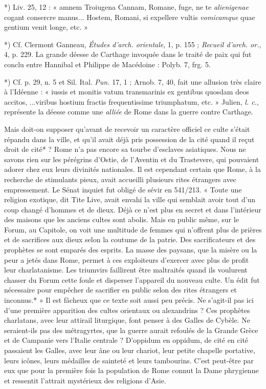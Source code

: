 \documentclass[a4paper, 11pt, oneside, polutonikogreek, french]{article}
\begin{document}
*) Liv. 25, 12 : « amnem Troiugena Cannam, Romane, fuge, ne te \emph{alienigenae} cogant consercre manus... Hostem, Romani, si expellere vultis \emph{vomicamque} quae gentium venit longe, etc. »

*) Cf. Clermont Ganneau, \emph{Études d'arch. orientale}, 1, p. 155 ; \emph{Recueil d'arch. or.}, 4, p. 229. La grande déesse de Carthage invoquée dans le traité de paix qui fut conclu entre Hannibal et Philippe de Macédoine : Polyb. 7, frg. 5.

*) Cf. p. 29, n. 5 et Sil. Ital. \emph{Pun.} 17, 1 ; Arnob. 7, 40, fait une allusion très claire à l'Idéenne : « iussis et monitis vatum transmarinis ex gentibus quosdam deos accitos, ...viribus hostium fractis frequentissime triumphatum, etc. » Julien, \emph{l. c.}, représente la déesse comme une \emph{alliée} de Rome dans la guerre contre Carthage.

Mais doit-on supposer qu'avant de recevoir un caractère officiel ce culte s'était répandu dans la ville, et qu'il avait déjà pris possession de la cité quand il reçut droit de cité* ? Rome n'a pas encore sa tourbe d'esclaves asiatiques. Nous ne savons rien sur les pérégrins d'Ostie, de l'Aventin et du Trastevere, qui pouvaient adorer chez eux leurs divinités nationales. Il est cependant certain que Rome, à la recherche de stimulants pieux, avait accueilli plusieurs rites étrangers avec empressement. Le Sénat inquiet fut obligé de sévir en 541/213. « Toute une religion exotique, dit Tite Live, avait envahi la ville qui semblait avoir tout d'un coup changé d'hommes et de dieux. Déjà ce n'est plus en secret et dans l'intérieur des maisons que les anciens cultes sont abolis. Mais en public même, sur le Forum, au Capitole, on voit une multitude de femmes qui n'offrent plus de prières et de sacrifices aux dieux selon la coutume de la patrie. Des sacrificateurs et des prophètes se sont emparés des esprits. La masse des paysans, que la misère ou la peur a jetés dans Rome, permet à ces exploiteurs d'exercer avec plus de profit leur charlatanisme. Les triumvirs faillirent être maltraités quand ils voulurent chasser du Forum cette foule et disperser l'appareil du nouveau culte. Un édit fut nécessaire pour empêcher de sacrifier en public selon des rites étrangers et inconnus.* » Il est fâcheux que ce texte soit aussi peu précis. Ne s'agit-il pas ici d'une première apparition des cultes orientaux ou alexandrins ? Ces prophètes charlatans, avec leur attirail liturgique, font penser à des Galles de Cybèle. Ne seraient-ils pas des métragyrtes, que la guerre aurait refoulés de la Grande Grèce et de Campanie vers l'Italie centrale ? D'oppidum en oppidum, de cité en cité passaient les Galles, avec leur âne ou leur chariot, leur petite chapelle portative, leurs icônes, leurs médailles de sainteté et leurs tambourins. C'est peut-être par eux que pour la première fois la population de Rome connut la Dame phrygienne et ressentit l'attrait mystérieux des religions d'Asie.
\end{document}
